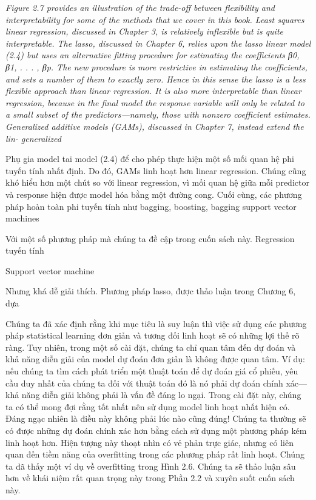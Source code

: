 \noindent\textit{Figure 2.7 provides an illustration of the trade-off between flexibility and interpretability for some of the methods that we cover in this book. Least squares linear regression, discussed in Chapter 3, is relatively inflexible but is quite interpretable. The lasso, discussed in Chapter 6, relies upon the lasso linear model (2.4) but uses an alternative fitting procedure for estimating the coefficients β0, β1, . . . , βp. The new procedure is more restrictive in estimating the coefficients, and sets a number of them to exactly zero. Hence in this sense the lasso is a less flexible approach than linear regression. It is also more interpretable than linear regression, because in the final model the response variable will only be related to a small subset of the predictors—namely, those with nonzero coefficient estimates. Generalized additive models (GAMs), discussed in Chapter 7, instead extend the lin- generalized}

Phụ gia model tai model (2.4) để cho phép thực hiện một số mối quan hệ phi tuyến tính nhất định. Do đó, GAMs linh hoạt hơn linear regression. Chúng cũng khó hiểu hơn một chút so với linear regression, vì mối quan hệ giữa mỗi predictor và response hiện được model hóa bằng một đường cong. Cuối cùng, các phương pháp hoàn toàn phi tuyến tính như bagging, boosting, bagging support vector machines

Với một số phương pháp mà chúng ta đề cập trong cuốn sách này. Regression tuyến tính

Support vector machine

Nhưng khá dễ giải thích. Phương pháp lasso, được thảo luận trong Chương 6, dựa

Chúng ta đã xác định rằng khi mục tiêu là suy luận thì việc sử dụng các phương pháp statistical learning đơn giản và tương đối linh hoạt sẽ có những lợi thế rõ ràng. Tuy nhiên, trong một số cài đặt, chúng ta chỉ quan tâm đến dự đoán và khả năng diễn giải của model dự đoán đơn giản là không được quan tâm. Ví dụ: nếu chúng ta tìm cách phát triển một thuật toán để dự đoán giá cổ phiếu, yêu cầu duy nhất của chúng ta đối với thuật toán đó là nó phải dự đoán chính xác—khả năng diễn giải không phải là vấn đề đáng lo ngại. Trong cài đặt này, chúng ta có thể mong đợi rằng tốt nhất nên sử dụng model linh hoạt nhất hiện có. Đáng ngạc nhiên là điều này không phải lúc nào cũng đúng! Chúng ta thường sẽ có được những dự đoán chính xác hơn bằng cách sử dụng một phương pháp kém linh hoạt hơn. Hiện tượng này thoạt nhìn có vẻ phản trực giác, nhưng có liên quan đến tiềm năng của overfitting trong các phương pháp rất linh hoạt. Chúng ta đã thấy một ví dụ về overfitting trong Hình 2.6. Chúng ta sẽ thảo luận sâu hơn về khái niệm rất quan trọng này trong Phần 2.2 và xuyên suốt cuốn sách này.

